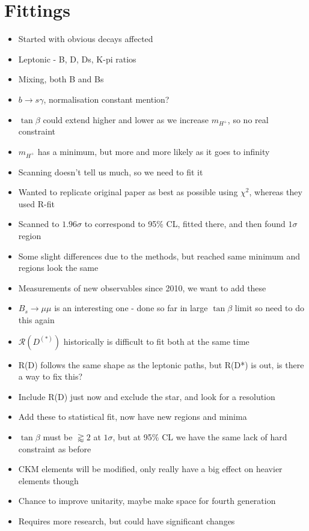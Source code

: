 \documentclass[12pt,a4paper]{article}
\begin{document}
\section{Fittings}
\begin{itemize}
    \item Started with obvious decays affected 
    \item Leptonic - B, D, Ds, K-pi ratios
    \item Mixing, both B and Bs
    \item $b\to s\gamma$, normalisation constant mention?
    \item $\tan\beta$ could extend higher and lower as we increase $m_{H^+}$, so no real constraint
    \item $m_{H^+}$ has a minimum, but more and more likely as it goes to infinity
    \item Scanning doesn't tell us much, so we need to fit it
    \item Wanted to replicate original paper as best as possible using $\chi^2$, whereas they used R-fit
    \item Scanned to $1.96\sigma$ to correspond to 95\% CL, fitted there, and then found $1\sigma$ region
    \item Some slight differences due to the methods, but reached same minimum and regions look the same
    \item Measurements of new observables since 2010, we want to add these
    \item $B_s\to\mu\mu$ is an interesting one - done so far in large $\tan\beta$ limit so need to do this again
    \item $\mathcal{R}(D^{(*)})$ historically is difficult to fit both at the same time
    \item R(D) follows the same shape as the leptonic paths, but R(D*) is out, is there a way to fix this?
    \item Include R(D) just now and exclude the star, and look for a resolution
    \item Add these to statistical fit, now have new regions and minima
    \item $\tan\beta$ must be $\gtrapprox2$ at $1\sigma$, but at 95\% CL we have the same lack of hard constraint as before
    \item CKM elements will be modified, only really have a big effect on heavier elements though
    \item Chance to improve unitarity, maybe make space for fourth generation
    \item Requires more research, but could have significant changes
\end{itemize}
\end{document}
